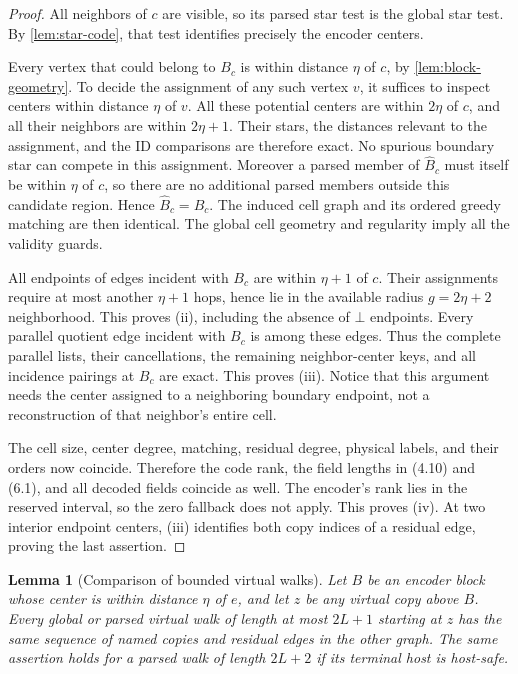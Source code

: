 \documentclass[11pt]{article}
\newtheorem{lemma}[theorem]{Lemma}
\theoremstyle{definition}
\theoremstyle{remark}
\begin{document}
\begin{proof}
All neighbors of $c$ are visible, so its parsed star test is the global
star test.  By \cref{lem:star-code}, that test identifies precisely the
encoder centers.

Every vertex that could belong to $B_c$ is within distance $\eta$ of $c$,
by \cref{lem:block-geometry}.  To decide the assignment of any such
vertex $v$, it suffices to inspect centers within distance $\eta$ of $v$.
All these potential centers are within $2\eta$ of $c$, and all their
neighbors are within $2\eta+1$.  Their stars, the distances relevant to
the assignment, and the ID comparisons are therefore exact.  No spurious
boundary star can compete in this assignment.  Moreover a parsed member
of $\widehat B_c$ must itself be within $\eta$ of $c$, so there are no
additional parsed members outside this candidate region.  Hence
$\widehat B_c=B_c$.  The induced cell graph and its ordered greedy matching
are then identical.  The global cell geometry and regularity imply all
the validity guards.

All endpoints of edges incident with $B_c$ are within $\eta+1$ of $c$.
Their assignments require at most another $\eta+1$ hops, hence lie in
the available radius $g=2\eta+2$ neighborhood.  This proves (ii), including
the absence of $\bot$ endpoints.  Every parallel quotient edge incident
with $B_c$ is among these edges.  Thus the complete parallel lists,
their cancellations, the remaining neighbor-center keys, and all incidence
pairings at $B_c$ are exact.  This proves (iii).  Notice that this argument
needs the center assigned to a neighboring boundary endpoint, not a
reconstruction of that neighbor's entire cell.

The cell size, center degree, matching, residual degree, physical labels,
and their orders now coincide.  Therefore the code rank, the field lengths
in (4.10) and (6.1), and all decoded fields coincide as well.  The encoder's
rank lies in the reserved interval, so the zero fallback does not apply.
This proves (iv).  At two interior endpoint centers, (iii) identifies both
copy indices of a residual edge, proving the last assertion.
\end{proof}

\begin{lemma}[Comparison of bounded virtual walks]
\label{lem:virtual-walks}
Let $B$ be an encoder block whose center is within distance $\eta$ of
$e$, and let $z$ be any virtual copy above $B$.
Every global or parsed virtual walk of length at most $2L+1$ starting at
$z$ has the same sequence of named copies and residual edges in the other
graph.  The same assertion holds for a parsed walk of length $2L+2$
if its terminal host is host-safe.
\end{lemma}
\end{document}
